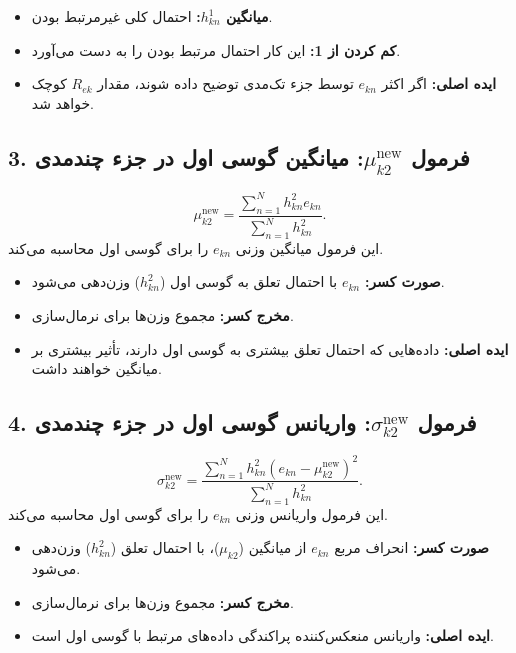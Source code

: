 \documentclass[a4paper,12pt,openany]{report}
\begin{document}
\begin{itemize}
	\begin{itemize}
		\item \textbf{میانگین \( h_{kn}^1 \):} احتمال کلی غیرمرتبط بودن.
		\item \textbf{کم کردن از 1:} 
		این کار احتمال مرتبط بودن را به دست می‌آورد.
		\item \textbf{ایده اصلی:} 
		اگر اکثر \( e_{kn} \) توسط جزء تک‌مدی توضیح داده شوند، مقدار \( R_{ek} \) کوچک خواهد شد.
	\end{itemize}
	

	
	\subsection*{3. فرمول \( \mu_{k2}^{\text{new}} \): میانگین گوسی اول در جزء چندمدی}
	\[
	\mu_{k2}^{\text{new}} = \frac{\sum_{n=1}^N h_{kn}^2 e_{kn}}{\sum_{n=1}^N h_{kn}^2}.
	\]
	این فرمول میانگین وزنی \( e_{kn} \) را برای گوسی اول محاسبه می‌کند.
	
	\begin{itemize}
		\item \textbf{صورت کسر:} 
		\( e_{kn} \) با احتمال تعلق به گوسی اول (\( h_{kn}^2 \)) وزن‌دهی می‌شود.
		\item \textbf{مخرج کسر:} 
		مجموع وزن‌ها برای نرمال‌سازی.
		\item \textbf{ایده اصلی:} 
		داده‌هایی که احتمال تعلق بیشتری به گوسی اول دارند، تأثیر بیشتری بر میانگین خواهند داشت.
	\end{itemize}
	

	
	\subsection*{4. فرمول \( \sigma_{k2}^{\text{new}} \): واریانس گوسی اول در جزء چندمدی}
	\[
	\sigma_{k2}^{\text{new}} = \frac{\sum_{n=1}^N h_{kn}^2 (e_{kn} - \mu_{k2}^{\text{new}})^2}{\sum_{n=1}^N h_{kn}^2}.
	\]
	این فرمول واریانس وزنی \( e_{kn} \) را برای گوسی اول محاسبه می‌کند.
	
	\begin{itemize}
		\item \textbf{صورت کسر:} 
		انحراف مربع \( e_{kn} \) از میانگین (\( \mu_{k2} \))، با احتمال تعلق (\( h_{kn}^2 \)) وزن‌دهی می‌شود.
		\item \textbf{مخرج کسر:} 
		مجموع وزن‌ها برای نرمال‌سازی.
		\item \textbf{ایده اصلی:} 
		واریانس منعکس‌کننده پراکندگی داده‌های مرتبط با گوسی اول است.
	\end{itemize}
	

\end{itemize}
\end{document}
